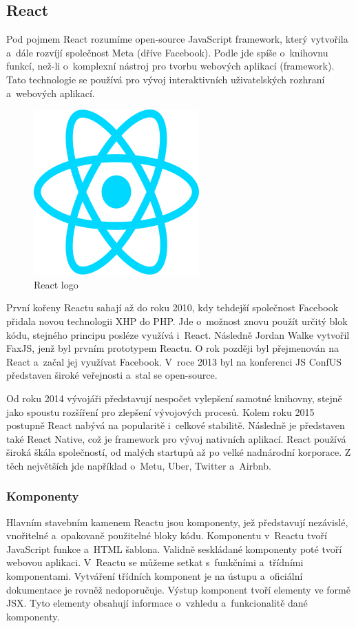 \subsection{React}

Pod pojmem React rozumíme open-source JavaScript framework, který vytvořila a~dále rozvíjí společnost Meta (dříve Facebook). 
Podle \cite{reactbanks} jde spíše o~knihovnu funkcí, než-li o~komplexní nástroj pro tvorbu webových aplikací (framework). 
Tato technologie se používá pro vývoj interaktivních uživatelských rozhraní a~webových aplikací.\cite{reacthubspot}

\begin{figure}[htb]
	\centering
		\includegraphics[width=.3\textwidth]{images/react-logo.png}
	\caption[React logo]{React logo \cite{react}}
	\label{fig:reactlogo}
\end{figure}

První kořeny Reactu sahají až do roku 2010, kdy tehdejší společnost Facebook přidala novou technologii XHP do PHP. 
Jde o~možnost znovu použít určitý blok kódu, stejného principu posléze využívá i~React. Následně Jordan Walke vytvořil FaxJS, jenž byl prvním prototypem Reactu.
O rok později byl přejmenován na React a~začal jej využívat Facebook. 
V~roce 2013 byl na konferenci JS ConfUS představen široké veřejnosti a~stal se open-source.

Od roku 2014 vývojáři představují nespočet vylepšení samotné knihovny, stejně jako spoustu rozšíření pro zlepšení vývojových procesů. 
Kolem roku 2015 postupně React nabývá na popularitě i~celkové stabilitě. Následně je představen také React Native, což je framework pro vývoj nativních aplikací.
React používá široká škála společností, od malých startupů až po velké nadnárodní korporace. 
Z těch největších jde například o~Metu, Uber, Twitter a~Airbnb.\cite{reactbanks,reactrisingstack}

\subsubsection{Komponenty}

Hlavním stavebním kamenem Reactu jsou komponenty, jež představují nezávislé, vnořitelné a~opakovaně použitelné bloky kódu. 
Komponentu v~Reactu tvoří JavaScript funkce a~HTML šablona. Validně seskládané komponenty poté tvoří webovou aplikaci.
V~Reactu se můžeme setkat s~funkčními a~třídními komponentami. Vytváření třídních komponent je na ústupu a~oficiální dokumentace je rovněž nedoporučuje. 
Výstup komponent tvoří elementy ve formě JSX. Tyto elementy obsahují informace o~vzhledu a~funkcionalitě dané komponenty.

